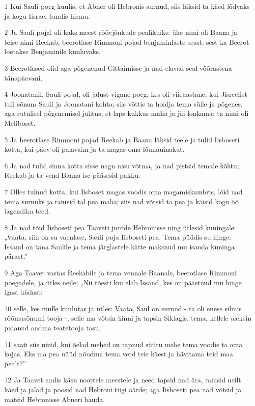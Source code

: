 \par 1 Kui Sauli poeg kuulis, et Abner oli Hebronis surnud, siis läksid ta käed lõdvaks ja kogu Iisrael tundis hirmu.
\par 2 Ja Sauli pojal oli kaks meest röövjõukude pealikuiks: ühe nimi oli Baana ja teise nimi Reekab, beerotlase Rimmoni pojad benjaminlaste seast; sest ka Beerot loetakse Benjaminile kuuluvaks.
\par 3 Beerotlased olid aga põgenenud Gittaimisse ja nad elavad seal võõrastena tänapäevani.
\par 4 Joonatanil, Sauli pojal, oli jalust vigane poeg, kes oli viieaastane, kui Jisreelist tuli sõnum Sauli ja Joonatani kohta; siis võttis ta hoidja tema sülle ja põgenes, aga rutulisel põgenemisel juhtus, et laps kukkus maha ja jäi lonkama; ta nimi oli Mefiboset.
\par 5 Ja beerotlase Rimmoni pojad Reekab ja Baana läksid teele ja tulid Iisboseti kotta, kui päev oli palavaim ja ta magas oma lõunauinakut.
\par 6 Ja nad tulid sinna kotta sisse nagu nisu võtma, ja nad pistsid temale kõhtu; Reekab ja ta vend Baana ise pääsesid pakku.
\par 7 Olles tulnud kotta, kui Iisboset magas voodis oma magamiskambris, lõid nad tema surnuks ja raiusid tal pea maha; siis nad võtsid ta pea ja käisid kogu öö lagendiku teed.
\par 8 Ja nad tõid Iisboseti pea Taaveti juurde Hebronisse ning ütlesid kuningale: „Vaata, siin on su vaenlase, Sauli poja Iisboseti pea. Tema püüdis su hinge. Issand on täna Saulile ja tema järglastele kätte maksnud mu isanda kuninga pärast.”
\par 9 Aga Taavet vastas Reekabile ja tema vennale Baanale, beerotlase Rimmoni poegadele, ja ütles neile: „Nii tõesti kui elab Issand, kes on päästnud mu hinge igast hädast:
\par 10 selle, kes mulle kuulutas ja ütles: Vaata, Saul on surnud - ta oli enese silmis rõõmusõnumi tooja -, selle ma võtsin kinni ja tapsin Siklagis, tema, kellele oleksin pidanud andma teatetooja tasu,
\par 11 saati siis nüüd, kui õelad mehed on tapnud süütu mehe tema voodis ta oma kojas. Eks ma pea nüüd nõudma tema verd teie käest ja hävitama teid maa pealt?”
\par 12 Ja Taavet andis käsu noortele meestele ja need tapsid nad ära, raiusid neilt käed ja jalad ja poosid nad Hebroni tiigi äärde; aga Iisboseti pea nad võtsid ja matsid Hebronisse Abneri hauda.

